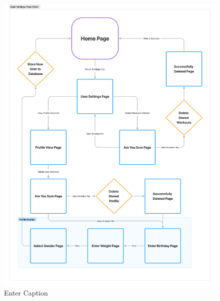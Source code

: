 \documentclass{l4proj}
\begin{document}
\begin{appendices}
\begin{figure}[h!]
    \centering
    \includegraphics[width=0.75\linewidth]{dissertation//dissImages/UserSettingFlow.pdf}
    \caption{Enter Caption}
    \label{fig:enter-label}
\end{figure}

\end{appendices}






\end{document}
